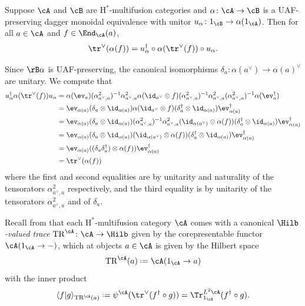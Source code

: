 \documentclass[12pt,reqno]{amsart}
\newcounter{alpha}\renewcommand\thealpha{\upshape\Alph{alpha}}
\newcommand{\Hstar}{\ensuremath{\mathrm{H}^{*}}}
\newcommand{\defn}[1]{\emph{#1}}
\DeclareRobustCommand{\coloneq}{\mathrel{\vcenter{\baselineskip0.5ex\lineskiplimit0pt\hbox{\scriptsize{\upshape.}}\hbox{\scriptsize{\upshape.}}}}=}
\begin{document}
\begin{lemma}
\label{lem:daggerstar}
Suppose $\cA$ and $\cB$ are $\Hstar$-multifusion categories and $\alpha\colon \cA \to \cB$ is a UAF-preserving dagger monoidal equivalence with unitor $u_\alpha\colon 1_\cB \to \alpha(1_\cA)$. Then for all $a \in \cA$ and $f \in \End_\cA(a)$,
\begin{equation}
\label{eq:dagger-star}
\tr^{\vee}(\alpha(f))=u_\alpha^\dag \circ \alpha(\tr^{\vee}(f)) \circ u_\alpha.
\end{equation}
\end{lemma}
\begin{pf}
Since $\rB\alpha$ is UAF-preserving, the canonical isomorphisms $\delta_a\colon\alpha(a^\vee)\to\alpha(a)^\vee$ are unitary. We compute that
\[
\begin{aligned}
u_\alpha^\dag\alpha(\tr^\vee(f))u_\alpha&=\alpha(\ev_a) (\alpha^2_{a^\vee,a})^{-1} \alpha^2_{a^\vee,a}\alpha(\id_{a^\vee}\otimes f)(\alpha^2_{a^\vee,a})^{-1}\alpha^2_{a^\vee,a} (\alpha^2_{a^\vee,a})^{-1}\alpha(\ev_a^\dag)
\\&
=\ev_{\alpha(a)}(\delta_a\otimes\id_{\alpha(a)}) \alpha(\id_{a^\vee}\otimes f) (\delta_a^\dag\otimes\id_{\alpha(a)})\ev_{\alpha(a)}^\dag
\\&
=\ev_{\alpha(a)}(\delta_a\otimes\id_{\alpha(a)})(\alpha^2_{a^\vee,a})^{-1} \alpha^2_{a^\vee,a}(\id_{\alpha(a^\vee)}\otimes\alpha(f))(\delta_a^\dag\otimes\id_{\alpha(a)})\ev_{\alpha(a)}^\dag
\\&
=\ev_{\alpha(a)}(\delta_a\otimes\id_{\alpha(a)})(\id_{\alpha(a^\vee)}\otimes\alpha(f))(\delta_a^\dag\otimes\id_{\alpha(a)})\ev_{\alpha(a)}^\dag
\\&
=\ev_{\alpha(a)}((\delta_a\delta_a^\dag)\otimes\alpha(f))\ev_{\alpha(a)}^\dag
\\&
=\tr^\vee(\alpha(f))
\end{aligned}
\]
where the first and second equalities are by unitarity and naturality of the tensorators $\alpha^2_{a^\vee,a}$ respectively, and the third equality is by unitarity of the tensorators $\alpha^2_{a^\vee,a}$ and of $\delta_a$.
\end{pf}

Recall from \cite[Rmk. 3.30]{bases} that each $\Hstar$-multifusion category $\cA$ comes with a canonical \defn{$\Hilb$-valued trace} $\mathrm{TR}^{\cA}\colon \cA \to \Hilb$ given by the corepresentable functor $\cA(1_\cA \to -)$, which at objects $a\in\cA$ is given by the Hilbert space
\[
\mathrm{TR}^{\cA}(a) \coloneq \cA(1_\cA \to a)
\]
with the inner product
\begin{equation}
\label{eq:tr-inner-product}
\langle f |g \rangle_{\mathrm{TR}^{\cA}(a)} \coloneq \psi^{\cA}(\tr^\vee(f^\dag \circ g)) = \Tr^{L^2\cA}_{1_\cA}(f^\dag \circ g).
\end{equation}
\end{document}
